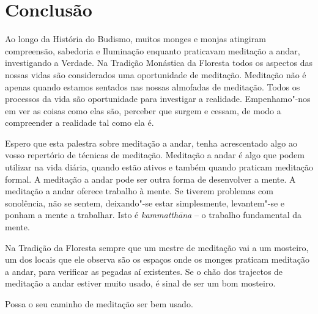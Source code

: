 \chapter{Conclusão}

Ao longo da História do Budismo, muitos monges e monjas atingiram
compreensão, sabedoria e Iluminação enquanto praticavam meditação a
andar, investigando a Verdade. Na Tradição Monástica da Floresta todos
os aspectos das nossas vidas são considerados uma oportunidade de
meditação. Meditação não é apenas quando estamos sentados nas nossas
almofadas de meditação. Todos os processos da vida são oportunidade para
investigar a realidade. Empenhamo"-nos em ver as coisas como elas são,
perceber que surgem e cessam, de modo a compreender a realidade tal como
ela é.

Espero que esta palestra sobre meditação a andar, tenha acrescentado algo
ao vosso repertório de técnicas de meditação. Meditação
a andar é algo que podem utilizar na vida diária, quando estão ativos e
também quando praticam meditação formal. A meditação a andar pode ser
outra forma de desenvolver a mente. A meditação a andar oferece trabalho
à mente. Se tiverem problemas com sonolência, não se sentem, deixando"-se
estar simplesmente, levantem"-se e ponham a mente a trabalhar. Isto é
\emph{kammatthāna} -- o trabalho fundamental da mente.

Na Tradição da Floresta sempre que um mestre de meditação vai a um
mosteiro, um dos locais que ele observa são os espaços onde os monges
praticam meditação a andar, para verificar as pegadas aí existentes. Se
o chão dos trajectos de meditação a andar estiver muito usado, é sinal de
ser um bom mosteiro.


Possa o seu caminho de meditação ser bem usado.

